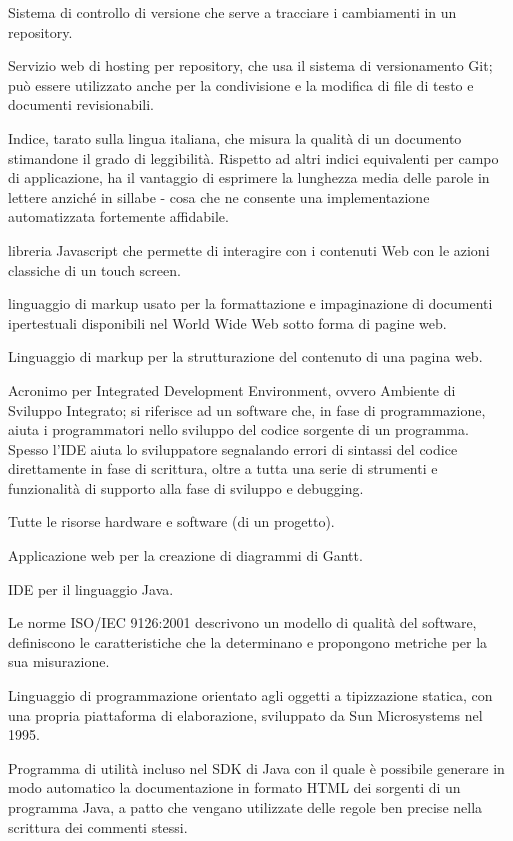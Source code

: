 \item[Git] Sistema di controllo di versione che serve a tracciare i cambiamenti in un repository.
\item[GitHub] Servizio web di hosting per repository, che usa il sistema di versionamento Git; può essere utilizzato anche per la condivisione e la modifica di file di testo e documenti revisionabili.
\item[Gulpease, indice di] Indice, tarato sulla lingua italiana, che misura la qualità di un documento stimandone il grado di leggibilità. Rispetto ad altri indici equivalenti per campo di applicazione, ha il vantaggio di esprimere la lunghezza media delle parole in lettere anziché in sillabe - cosa che ne consente una implementazione automatizzata fortemente affidabile. 
\item[Hammer.js] libreria Javascript che permette di interagire con i contenuti Web con le azioni classiche di un touch screen.
\item[HTML] linguaggio di markup usato per la formattazione e impaginazione di documenti ipertestuali disponibili nel World Wide Web sotto forma di pagine web.
\item[HTML5] Linguaggio di markup per la strutturazione del contenuto di una pagina web.
\item[IDE]  Acronimo per Integrated Development Environment, ovvero Ambiente di Sviluppo Integrato; si riferisce ad un software che, in fase di programmazione, aiuta i programmatori nello sviluppo del codice sorgente di un programma. Spesso l'IDE aiuta lo sviluppatore segnalando errori di sintassi del codice direttamente in fase di scrittura, oltre a tutta una serie di strumenti e funzionalità di supporto alla fase di sviluppo e debugging.
\item[infrastruttura] Tutte le risorse hardware e software (di un progetto).
\item[Instagantt] Applicazione web per la creazione di diagrammi di Gantt.
\item[IntelliJ Idea] IDE per il linguaggio Java.
\item[ISO/IEC 9126:2001] Le norme ISO/IEC 9126:2001 descrivono un modello di qualità del software, definiscono le caratteristiche che la determinano e propongono metriche per la sua misurazione.
\item[Java] Linguaggio di programmazione orientato agli oggetti a tipizzazione statica, con una propria piattaforma di elaborazione, sviluppato da Sun Microsystems nel 1995.
\item[Javadoc] Programma di utilità incluso nel SDK di Java con il quale è possibile generare in modo automatico la documentazione in formato HTML dei sorgenti di un programma Java, a patto che vengano utilizzate delle regole ben precise nella scrittura dei commenti stessi.
